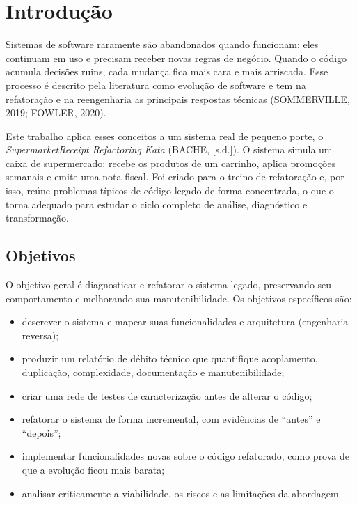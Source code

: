 \documentclass[12pt,a4paper]{article}
\begin{document}
\thispagestyle{empty}
\tableofcontents
\newpage
\pagestyle{fancy}\fancyhf{}\fancyhead[R]{\small\thepage}\renewcommand{\headrulewidth}{0pt}

\section{Introdução}

Sistemas de software raramente são abandonados quando funcionam: eles continuam em uso e precisam receber novas regras de negócio. Quando o código acumula decisões ruins, cada mudança fica mais cara e mais arriscada. Esse processo é descrito pela literatura como evolução de software e tem na refatoração e na reengenharia as principais respostas técnicas (SOMMERVILLE, 2019; FOWLER, 2020).

Este trabalho aplica esses conceitos a um sistema real de pequeno porte, o \textit{SupermarketReceipt Refactoring Kata} (BACHE, [s.d.]). O sistema simula um caixa de supermercado: recebe os produtos de um carrinho, aplica promoções semanais e emite uma nota fiscal. Foi criado para o treino de refatoração e, por isso, reúne problemas típicos de código legado de forma concentrada, o que o torna adequado para estudar o ciclo completo de análise, diagnóstico e transformação.

\subsection{Objetivos}

O objetivo geral é diagnosticar e refatorar o sistema legado, preservando seu comportamento e melhorando sua manutenibilidade. Os objetivos específicos são:
\begin{itemize}
\item descrever o sistema e mapear suas funcionalidades e arquitetura (engenharia reversa);
\item produzir um relatório de débito técnico que quantifique acoplamento, duplicação, complexidade, documentação e manutenibilidade;
\item criar uma rede de testes de caracterização antes de alterar o código;
\item refatorar o sistema de forma incremental, com evidências de ``antes'' e ``depois'';
\item implementar funcionalidades novas sobre o código refatorado, como prova de que a evolução ficou mais barata;
\item analisar criticamente a viabilidade, os riscos e as limitações da abordagem.
\end{itemize}
\end{document}
